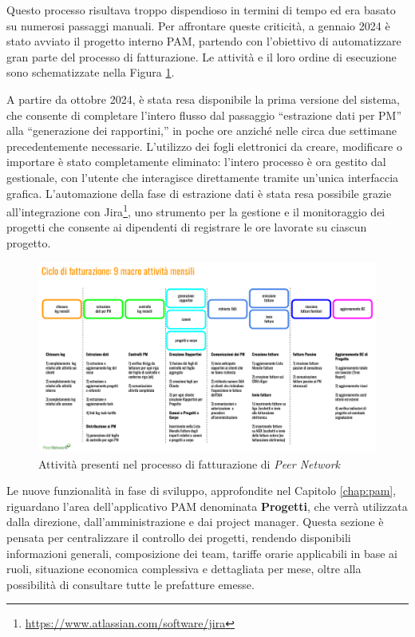 Questo processo risultava troppo dispendioso in termini di tempo ed era basato su numerosi passaggi manuali. Per affrontare queste criticità, a gennaio 2024
è stato avviato il progetto interno \ac{PAM}, partendo con l’obiettivo di automatizzare gran parte del processo di fatturazione.
Le attività e il loro ordine di esecuzione sono schematizzate nella Figura \ref{fig:fatturazione}.

A partire da ottobre 2024, è stata resa disponibile la prima versione del sistema, che consente di completare l’intero flusso dal passaggio “estrazione dati
per PM” alla “generazione dei rapportini,” in poche ore anziché nelle circa due settimane precedentemente necessarie. L’utilizzo dei fogli elettronici da creare,
modificare o importare è stato completamente eliminato: l’intero processo è ora gestito dal gestionale, con l’utente che interagisce direttamente tramite un’unica
interfaccia grafica. L’automazione della fase di estrazione dati è stata resa possibile grazie all’integrazione con Jira\footnote{\url{https://www.atlassian.com/software/jira}},
uno strumento per la gestione e il monitoraggio dei progetti che consente ai dipendenti di registrare le ore lavorate su ciascun progetto.

\begin{figure}
    \centering
    \includegraphics[width=\linewidth]{figures/fasiFatturazionePN.pdf}
    \caption{Attività presenti nel processo di fatturazione di \textit{Peer Network}}
    \label{fig:fatturazione}
\end{figure}

Le nuove funzionalità in fase di sviluppo, approfondite nel Capitolo \ref{chap:pam}, riguardano l’area dell’applicativo \ac{PAM} denominata \textbf{Progetti}, che verrà
utilizzata dalla direzione, dall’amministrazione e dai project manager. Questa sezione è pensata per centralizzare il controllo dei progetti, rendendo disponibili
informazioni generali, composizione dei team, tariffe orarie applicabili in base ai ruoli, situazione economica complessiva e dettagliata per mese, oltre alla
possibilità di consultare tutte le prefatture emesse.

